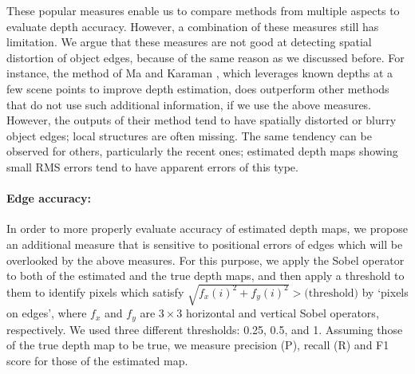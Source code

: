\documentclass[10pt,twocolumn,letterpaper]{article}
\begin{document}
These popular measures enable us to compare methods from multiple aspects to evaluate depth accuracy. However, a combination of these measures still has limitation. We argue that these measures are not good at detecting spatial distortion of object edges, because of the same reason as we discussed before. For instance, the method of Ma and Karaman \cite{ma2017sparse}, which leverages known depths at a few scene points to improve depth estimation, does outperform other methods that do not use such additional information, if we use the above measures.
However, the outputs of their method tend to have spatially distorted or blurry object edges; local structures are often missing. The same tendency can be observed for others, particularly the recent ones; estimated depth maps showing small RMS errors tend to have apparent errors of this type.

\paragraph{Edge accuracy:} In order to more properly evaluate accuracy of estimated depth maps, we propose an additional measure that is sensitive to positional errors of edges which will be overlooked by the above measures. 
For this purpose, we apply the Sobel operator \cite{sobel19683x3} to both of the estimated and the true depth maps, and then apply a threshold to them to identify pixels which satisfy
$\sqrt{f_{x}(i)^{2} + f_{y}(i)^{2}} > \mbox{(threshold})$ by `pixels on edges', 
where $f_{x}$ and $f_{y}$ are $3\times3$ horizontal and vertical Sobel operators, respectively. We used three different thresholds: 0.25, 0.5, and 1. Assuming those of the true depth map to be true, we measure precision (P), recall (R) and F1 score for those of the estimated map. 
\end{document}
